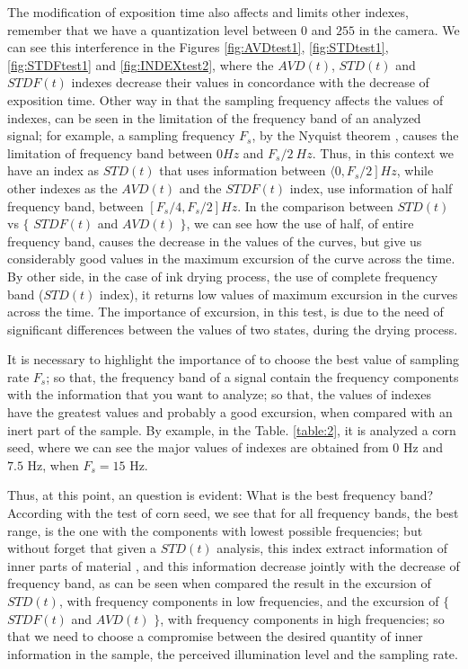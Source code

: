 \documentclass[review]{elsarticle}
\begin{document}
The modification of exposition time also affects  and limits other indexes,
remember that we have a quantization level between $0$ and $255$ in the camera. 
We can see this interference in the Figures \ref{fig:AVDtest1}, \ref{fig:STDtest1}, \ref{fig:STDFtest1} and \ref{fig:INDEXtest2}, 
where the $AVD(t)$, $STD(t)$ and $STDF(t)$ indexes decrease their values in concordance with the decrease of exposition time.
Other way in that  the sampling frequency affects the values of indexes,
can be seen in the limitation of
the frequency band of an analyzed signal; for example,
a sampling frequency $F_s$, by the Nyquist theorem \cite{Nyquist,Shannon}, 
causes  the limitation of  frequency band %
between $0 Hz$ and $F_s/2~Hz$.
Thus, in this context we have an index as $STD(t)$ that uses information between $\langle \left. 0, F_s/2 \right ] Hz$, 
while other  indexes as the $AVD(t)$ and the $STDF(t)$ index, use information of half frequency band, 
between $\left [ F_s/4, F_s/2 \right ] Hz$.
In the comparison between $STD(t)$ vs  $\{$ $STDF(t)$ and $AVD(t)$ $\}$, 
we can see how the use of half, of entire frequency band, causes the decrease in the values of the curves, 
but give us considerably good values in the maximum excursion of the curve across the time. By other side,
in the case of ink drying process, the use of complete frequency band ($STD(t)$ index), 
it returns low values of maximum excursion in the curves across the time. 
The importance of excursion, in this test,
 is due to the need of significant differences between the values of two states,
during the
drying process.

It is necessary to highlight the importance of to choose the best value of sampling rate $F_s$;
so that, 
the frequency band of a signal contain the frequency components with the information that you want to analyze;
so that, the values of indexes have the greatest values and probably a good excursion, 
when compared with an inert part of  the sample. 
By example, in the Table. \ref{table:2}, it is analyzed a corn seed, 
where we can see  the major values of indexes are obtained 
from $0$ Hz and $7.5$ Hz, when $F_s=15$ Hz. 

Thus, at this point,
an question is evident: 
What is the best frequency band? According with the test of corn seed, 
we see that for all frequency bands, 
the best range, 
is the one with the components with lowest possible frequencies; 
but without forget that given a $STD(t)$ analysis, 
this index extract information of inner parts of material \cite{Nothdurft:05}, 
and this information decrease jointly with the decrease of frequency band,
as can be seen when compared the result in the excursion of $STD(t)$, 
with frequency components in low frequencies,
and the excursion of $\{$ $STDF(t)$ and $AVD(t)$ $\}$, 
with frequency components in high frequencies;
so that we need to choose a compromise between the desired quantity of inner information in the sample, 
the perceived illumination level and the sampling rate.
\end{document}
